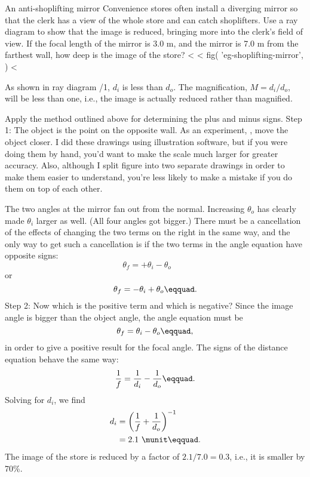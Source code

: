 \begin{eg}{An anti-shoplifting mirror}\label{eg:shoplifting-mirror}
\egquestion Convenience stores often install a diverging
mirror so that the clerk has a view of the whole store and
can catch shoplifters. Use a ray diagram to show that the
image is reduced, bringing more into the clerk's field of
view. If the focal length of the mirror is 3.0 m, and the
mirror is 7.0 m from the farthest wall, how deep is
the image of the store?
<%
<%
  fig(
    'eg-shoplifting-mirror',
  )
<%

\eganswer 
As shown in ray diagram /1, $d_i$ is less than
$d_o$. The magnification, $M= d_i/d_o$, will be less than
one, i.e., the image is actually reduced rather than magnified.

Apply the method outlined above for determining the
plus and minus signs. Step 1: 
The object is the point on the
opposite wall. As an experiment, , move the
object closer. I did these drawings using illustration
software, but if you were doing them by hand, you'd want to
make the scale much larger for greater accuracy. Also,
although I split figure  into two separate drawings in
order to make them easier to understand, you're less likely
to make a mistake if you do them on top of each other.

        The two angles at the mirror fan out from the normal.
Increasing $\theta_o$ has clearly made $\theta_i$ larger as
well. (All four angles got bigger.) There must be a
cancellation of the effects of changing the two terms on the
right in the same way, and the only way to get such a
cancellation is if the two terms in the angle equation
have opposite signs:
\begin{equation*}
                        \theta_f =  + \theta_i  -  \theta_o \qquad
\end{equation*}
or
\begin{equation*}
                        \theta_f =  - \theta_i  +  \theta_o\eqquad.
\end{equation*}
        Step 2: Now which is the positive term and which is
negative? Since the image angle is bigger than the object
angle, the angle equation must be
\begin{equation*}
                        \theta_f =     \theta_i  -  \theta_o\eqquad,
\end{equation*}
in order to give a positive result for the focal angle. The
signs of the distance equation behave the same way:
\begin{equation*}
                        \frac{1}{f}         = \frac{1}{d_i}-\frac{1}{d_o}\eqquad.
\end{equation*}
Solving for $d_i$, we find
\begin{align*}
                        d_i         &= \left(\frac{1}{f}+\frac{1}{d_o}\right)^{-1}\\
                                 &= 2.1\ \munit\eqquad.
\end{align*}
The image of the store is reduced by a factor of $2.1/7.0=0.3$,
i.e., it is smaller by 70\%.
\end{eg}

